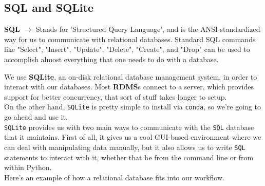 \documentclass[english, 10pt]{article}
\begin{document}
\subsection{SQL and SQLite}

\begin{tcolorbox}[title=Definition:,colframe=red!75!black,colback=red!5!white,arc=0pt,fonttitle=\bfseries]
\textbf{SQL} $\rightarrow$ Stands for 'Structured Query Language', and is the ANSI-standardized way for us to communicate with relational databases. Standard SQL commands like "Select", "Insert", "Update", "Delete", "Create", and "Drop" can be used to accomplish almost everything that one needs to do with a database.
\end{tcolorbox}

\hfill \break We use \textbf{SQLite}, an on-disk relational database management system, in order to interact with our databases. Most \textbf{RDMS}s connect to a server, which provides support for better concurrency, that sort of stuff takes longer to setup.\\

On the other hand, \texttt{SQLite} is pretty simple to install via \texttt{conda}, so we're going to go ahead and use it.\\

\texttt{SQLite} provides us with two main ways to communicate with the \texttt{SQL} database that it maintains. First of all, it gives us a cool GUI-based environment where we can deal with manipulating data manually, but it also allows us to write \texttt{SQL} statements to interact with it, whether that be from the command line or from within Python.\\

Here's an example of how a relational database fits into our workflow.\\\\
\end{document}
